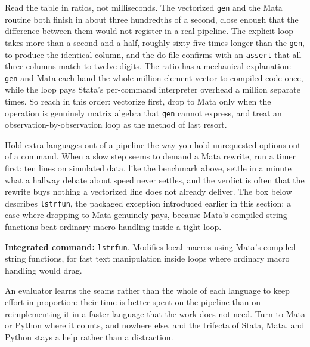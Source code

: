 \documentclass[
    a4paper,
    fontsize=10pt,
    twoside=true,
    numbers=noenddot,
]{kaobook}
\begin{document}
Read the table in ratios, not milliseconds. The vectorized \texttt{gen} and the Mata routine both finish in about three hundredths of a second, close enough that the difference between them would not register in a real pipeline. The explicit loop takes more than a second and a half, roughly sixty-five times longer than the \texttt{gen}, to produce the identical column, and the do-file confirms with an \texttt{assert} that all three columns match to twelve digits. The ratio has a mechanical explanation: \texttt{gen} and Mata each hand the whole million-element vector to compiled code once, while the loop pays Stata's per-command interpreter overhead a million separate times. So reach in this order: vectorize first, drop to Mata only when the operation is genuinely matrix algebra that \texttt{gen} cannot express, and treat an observation-by-observation loop as the method of last resort.

Hold extra languages out of a pipeline the way you hold unrequested options out of a command. When a slow step seems to demand a Mata rewrite, run a timer first: ten lines on simulated data, like the benchmark above, settle in a minute what a hallway debate about speed never settles, and the verdict is often that the rewrite buys nothing a vectorized line does not already deliver. The box below describes \texttt{lstrfun}, the packaged exception introduced earlier in this section: a case where dropping to Mata genuinely pays, because Mata's compiled string functions beat ordinary macro handling inside a tight loop.

\begin{kaobox}[frametitle=Package Integration: \texttt{lstrfun}]
\textbf{Integrated command:} \texttt{lstrfun}. Modifies local macros using Mata's compiled string functions, for fast text manipulation inside loops where ordinary macro handling would drag.
\end{kaobox}

An evaluator learns the seams rather than the whole of each language to keep effort in proportion: their time is better spent on the pipeline than on reimplementing it in a faster language that the work does not need. Turn to Mata or Python where it counts, and nowhere else, and the trifecta of Stata, Mata, and Python stays a help rather than a distraction.
\end{document}
